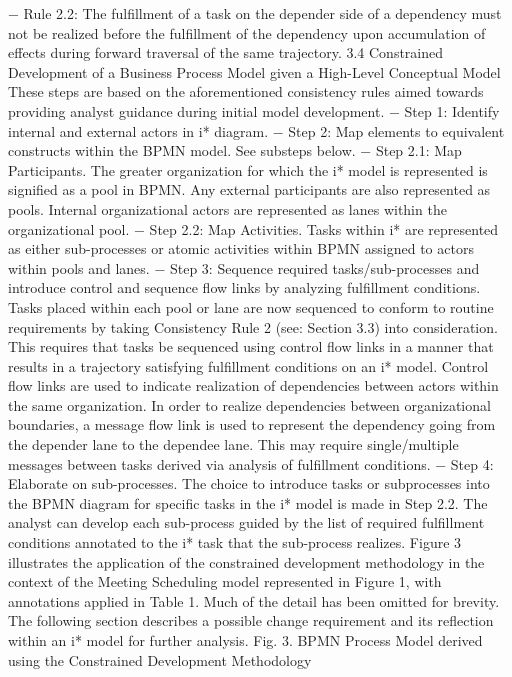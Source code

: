 − Rule 2.2: The fulfillment of a task on the depender side of a dependency must
not be realized before the fulfillment of the dependency upon accumulation of
effects during forward traversal of the same trajectory.
3.4 Constrained Development of a Business Process Model given a High-Level
Conceptual Model
These steps are based on the aforementioned consistency rules aimed towards providing analyst guidance during initial model development.
− Step 1: Identify internal and external actors in i* diagram.
− Step 2: Map elements to equivalent constructs within the BPMN model. See substeps below.
− Step 2.1: Map Participants. The greater organization for which the i* model is
represented is signified as a pool in BPMN. Any external participants are also
represented as pools. Internal organizational actors are represented as lanes
within the organizational pool.
− Step 2.2: Map Activities. Tasks within i* are represented as either sub-processes
or atomic activities within BPMN assigned to actors within pools and lanes.
− Step 3: Sequence required tasks/sub-processes and introduce control and sequence
flow links by analyzing fulfillment conditions. Tasks placed within each pool or
lane are now sequenced to conform to routine requirements by taking Consistency
Rule 2 (see: Section 3.3) into consideration. This requires that tasks be sequenced
using control flow links in a manner that results in a trajectory satisfying fulfillment conditions on an i* model. Control flow links are used to indicate realization
of dependencies between actors within the same organization. In order to realize
dependencies between organizational boundaries, a message flow link is used to
represent the dependency going from the depender lane to the dependee lane. This
may require single/multiple messages between tasks derived via analysis of fulfillment conditions.
− Step 4: Elaborate on sub-processes. The choice to introduce tasks or subprocesses into the BPMN diagram for specific tasks in the i* model is made in Step
2.2. The analyst can develop each sub-process guided by the list of required fulfillment conditions annotated to the i* task that the sub-process realizes.
Figure 3 illustrates the application of the constrained development methodology in
the context of the Meeting Scheduling model represented in Figure 1, with annotations applied in Table 1. Much of the detail has been omitted for brevity. The following section describes a possible change requirement and its reflection within an i*
model for further analysis.
Fig. 3. BPMN Process Model derived using the Constrained Development Methodology

